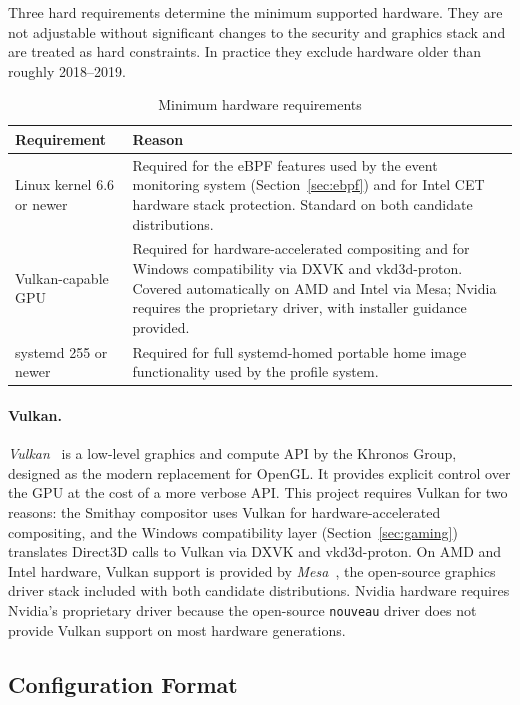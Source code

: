 Three hard requirements determine the minimum supported hardware. They are not
adjustable without significant changes to the security and graphics stack and
are treated as hard constraints. In practice they exclude hardware older than
roughly 2018--2019.

\begin{table}[htbp]
\caption{Minimum hardware requirements}
\label{tab:hardware}
\begin{tabularx}{\linewidth}{lX}
\toprule
\textbf{Requirement} & \textbf{Reason} \\
\midrule
Linux kernel 6.6 or newer &
  Required for the eBPF features used by the event monitoring system
  (Section~\ref{sec:ebpf}) and for Intel CET hardware stack protection.
  Standard on both candidate distributions. \\
Vulkan-capable GPU &
  Required for hardware-accelerated compositing and for Windows compatibility
  via DXVK and vkd3d-proton. Covered automatically on AMD and Intel via Mesa;
  Nvidia requires the proprietary driver, with installer guidance provided. \\
systemd 255 or newer &
  Required for full systemd-homed portable home image functionality used by
  the profile system. \\
\bottomrule
\end{tabularx}
\end{table}

\paragraph{Vulkan.}
\emph{Vulkan}~\cite{vulkan} is a low-level graphics and
compute API by the Khronos Group, designed as the modern replacement for OpenGL.
It provides explicit control over the GPU at the cost of a more verbose API.
This project requires Vulkan for two reasons: the Smithay compositor uses Vulkan
for hardware-accelerated compositing, and the Windows compatibility layer
(Section~\ref{sec:gaming}) translates Direct3D calls to Vulkan via DXVK and
vkd3d-proton. On AMD and Intel hardware, Vulkan support is provided by
\emph{Mesa}~\cite{mesa}, the open-source graphics
driver stack included with both candidate distributions. Nvidia hardware requires
Nvidia's proprietary driver because the open-source \texttt{nouveau} driver does
not provide Vulkan support on most hardware generations.

\subsection{Configuration Format}
\label{sec:config}

